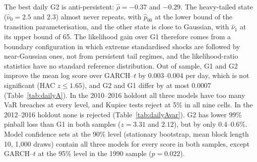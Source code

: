 \documentclass[11pt,a4paper]{article}
\theoremstyle{plain}
\theoremstyle{remark}
\begin{document}
The best daily G2 is anti-persistent: $\hat\rho=-0.37$ and $-0.29$. The heavy-tailed state ($\hat\nu_0=2.5$ and $2.3$) almost never repeats, with $\hat p_{00}$ at the lower bound of the transition parameterisation, and the other state is close to Gaussian, with $\hat\nu_1$ at its upper bound of 65. The likelihood gain over G1 therefore comes from a boundary configuration in which extreme standardised shocks are followed by near-Gaussian ones, not from persistent tail regimes, and the likelihood-ratio statistics have no standard reference distribution. Out of sample, G1 and G2 improve the mean log score over GARCH--$t$ by 0.003--0.004 per day, which is not significant (HAC $z\le1.65$), and G2 and G1 differ by at most 0.0007 (Table~\ref{tab:dailyA}). In the 2010--2016 holdout all three models have too many VaR breaches at every level, and Kupiec tests reject at 5\% in all nine cells. In the 2012--2016 holdout none is rejected (Table~\ref{tab:dailyAvar}). G2 has lower 99\% pinball loss than G1 in both samples ($z=3.31$ and $2.12$), but by only 0.4--0.6\%. Model confidence sets \citep{hansen2011} at the 90\% level (stationary bootstrap, mean block length 10, 1{,}000 draws) contain all three models for every score in both samples, except GARCH--$t$ at the 95\% level in the 1990 sample ($p=0.022$).
\end{document}
